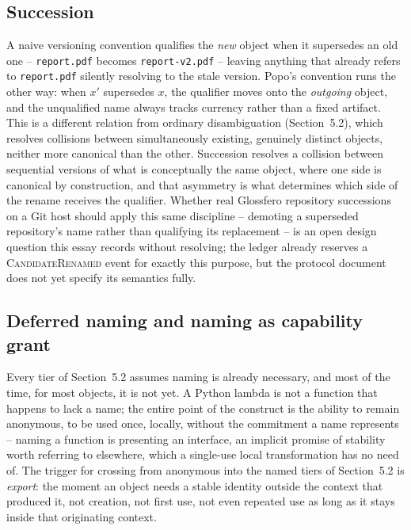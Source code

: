\documentclass[11pt]{article}
\begin{document}
\subsection{Succession}

A naive versioning convention qualifies the \emph{new} object when it supersedes an old one -- \texttt{report.pdf} becomes \texttt{report-v2.pdf} -- leaving anything that already refers to \texttt{report.pdf} silently resolving to the stale version. Popo's convention runs the other way: when $x'$ supersedes $x$, the qualifier moves onto the \emph{outgoing} object, and the unqualified name always tracks currency rather than a fixed artifact. This is a different relation from ordinary disambiguation (Section~5.2), which resolves collisions between simultaneously existing, genuinely distinct objects, neither more canonical than the other. Succession resolves a collision between sequential versions of what is conceptually the same object, where one side is canonical by construction, and that asymmetry is what determines which side of the rename receives the qualifier. Whether real Glossfero repository successions on a Git host should apply this same discipline -- demoting a superseded repository's name rather than qualifying its replacement -- is an open design question this essay records without resolving; the ledger already reserves a \textsc{CandidateRenamed} event for exactly this purpose, but the protocol document does not yet specify its semantics fully.

\subsection{Deferred naming and naming as capability grant}

Every tier of Section~5.2 assumes naming is already necessary, and most of the time, for most objects, it is not yet. A Python lambda is not a function that happens to lack a name; the entire point of the construct is the ability to remain anonymous, to be used once, locally, without the commitment a name represents -- naming a function is presenting an interface, an implicit promise of stability worth referring to elsewhere, which a single-use local transformation has no need of. The trigger for crossing from anonymous into the named tiers of Section~5.2 is \emph{export}: the moment an object needs a stable identity outside the context that produced it, not creation, not first use, not even repeated use as long as it stays inside that originating context.
\end{document}
